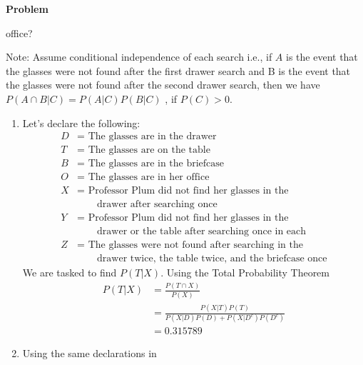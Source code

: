 \documentclass[12pt]{article}
\newenvironment{Ex}{\textbf{Problem}\vspace{.75em}\\}{}
\begin{document}
\begin{enumerate}
\begin{Ex}
\begin{enumerate}
      office?
    \end{enumerate}
    Note: Assume conditional independence of each search i.e., if $A$
    is the event that the glasses were not found after the first
    drawer search and B is the event that the glasses were not found
    after the second drawer search, then we have $P(A \cap B | C) =
    P(A|C)P(B|C)$ , if $P(C) > 0$.
    \pagebreak[4]
    \begin{solution} \hfill
      \begin{enumerate}
      \item Let's declare the following:
        \begin{equation}
          \label{eq:5-var-declaration}
          \begin{aligned}
            D &= \text{ The glasses are in the drawer} \\
            T &= \text{ The glasses are on the table} \\
            B &= \text{ The glasses are in the briefcase} \\
            O &= \text{ The glasses are in her office} \\
            X &= \text{ Professor Plum did not find her glasses in
              the} \\
            &\quad\quad\text{drawer after searching once} \\
            Y &= \text{ Professor Plum did not find her glasses in
              the} \\
            &\quad\quad\text{drawer or the table after searching once
              in each} \\
            Z &= \text{ The glasses were not found after searching in
              the} \\
            &\quad\quad\text{drawer twice, the table twice, and the briefcase once}
          \end{aligned}
        \end{equation}
        We are tasked to find $P(T | X)$. Using the Total Probability Theorem
        \begin{equation}
          \label{eq:5a-sol}
          \begin{aligned}
            P(T | X) &= \frac{P(T \cap X)}{P(X)} \\
            &= \frac{P(X|T)P(T)}{P(X|D)P(D) + P(X|D^c)P(D^c)} \\
            &= 0.315789
          \end{aligned}
        \end{equation}
      \item Using the same declarations in

\end{enumerate}
\end{solution}
\end{Ex}
\end{enumerate}
\end{document}
